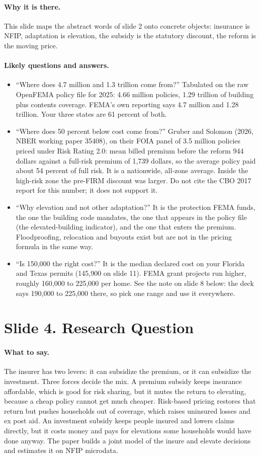 \documentclass[11pt]{article}
\newcommand{\slide}[2]{\section*{Slide #1. #2}\addcontentsline{toc}{section}{Slide #1. #2}}
\newcommand{\say}{\paragraph{What to say.}}
\newcommand{\why}{\paragraph{Why it is there.}}
\newcommand{\qa}{\paragraph{Likely questions and answers.}}
\begin{document}
\why This slide maps the abstract words of slide 2 onto concrete objects: insurance is NFIP, adaptation is elevation, the subsidy is the statutory discount, the reform is the moving price.

\qa
\begin{itemize}
\item ``Where does 4.7 million and 1.3 trillion come from?'' Tabulated on the raw OpenFEMA policy file for 2025: 4.66 million policies, 1.29 trillion of building plus contents coverage. FEMA's own reporting says 4.7 million and 1.28 trillion. Your three states are 61 percent of both.
\item ``Where does 50 percent below cost come from?'' Gruber and Solomon (2026, NBER working paper 35408), on their FOIA panel of 3.5 million policies priced under Risk Rating 2.0: mean billed premium before the reform 944 dollars against a full-risk premium of 1,739 dollars, so the average policy paid about 54 percent of full risk. It is a nationwide, all-zone average. Inside the high-risk zone the pre-FIRM discount was larger. Do not cite the CBO 2017 report for this number; it does not support it.
\item ``Why elevation and not other adaptation?'' It is the protection FEMA funds, the one the building code mandates, the one that appears in the policy file (the elevated-building indicator), and the one that enters the premium. Floodproofing, relocation and buyouts exist but are not in the pricing formula in the same way.
\item ``Is 150,000 the right cost?'' It is the median declared cost on your Florida and Texas permits (145,900 on slide 11). FEMA grant projects run higher, roughly 160,000 to 225,000 per home. See the note on slide 8 below: the deck says 190,000 to 225,000 there, so pick one range and use it everywhere.
\end{itemize}

\slide{4}{Research Question}
\say The insurer has two levers: it can subsidize the premium, or it can subsidize the investment. Three forces decide the mix. A premium subsidy keeps insurance affordable, which is good for risk sharing, but it mutes the return to elevating, because a cheap policy cannot get much cheaper. Risk-based pricing restores that return but pushes households out of coverage, which raises uninsured losses and ex post aid. An investment subsidy keeps people insured and lowers claims directly, but it costs money and pays for elevations some households would have done anyway. The paper builds a joint model of the insure and elevate decisions and estimates it on NFIP microdata.
\end{document}
